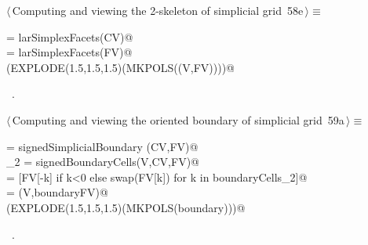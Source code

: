 \documentclass[11pt,oneside]{article}    %
\begin{document}
\begin{flushleft} \small \label{scrap107}
\protect{}$\langle\,$Computing and viewing the 2-skeleton of simplicial grid\nobreak\ {\footnotesize 58e}$\,\rangle\equiv$
\vspace{-1ex}
\begin{list}{}{} \item
\mbox{}\verb@FV = larSimplexFacets(CV)@\\
\mbox{}\verb@EV = larSimplexFacets(FV)@\\
\mbox{}\verb@VIEW(EXPLODE(1.5,1.5,1.5)(MKPOLS((V,FV))))@\\
\mbox{}\verb@@{\NWsep}
\end{list}
\vspace{-1ex}
\footnotesize\addtolength{\baselineskip}{-1ex}
\begin{list}{}{\setlength{\itemsep}{-\parsep}\setlength{\itemindent}{-\leftmargin}}
\item \NWtxtMacroRefIn\ .
\end{list}
\end{flushleft}

\begin{flushleft} \small \label{scrap108}
\protect{}$\langle\,$Computing and viewing the oriented boundary of simplicial grid\nobreak\ {\footnotesize 59a}$\,\rangle\equiv$
\vspace{-1ex}
\begin{list}{}{} \item
\mbox{}\verb@csrSignedBoundaryMat = signedSimplicialBoundary (CV,FV)@\\
\mbox{}\verb@boundaryCells_2 = signedBoundaryCells(V,CV,FV)@\\
\mbox{}\verb@boundaryFV = [FV[-k] if k<0 else swap(FV[k]) for k in boundaryCells_2]@\\
\mbox{}\verb@boundary = (V,boundaryFV)@\\
\mbox{}\verb@VIEW(EXPLODE(1.5,1.5,1.5)(MKPOLS(boundary)))@\\
\mbox{}\verb@@{\NWsep}
\end{list}
\vspace{-1ex}
\footnotesize\addtolength{\baselineskip}{-1ex}
\begin{list}{}{\setlength{\itemsep}{-\parsep}\setlength{\itemindent}{-\leftmargin}}
\item \NWtxtMacroRefIn\ .
\end{list}
\end{flushleft}
\end{document}
